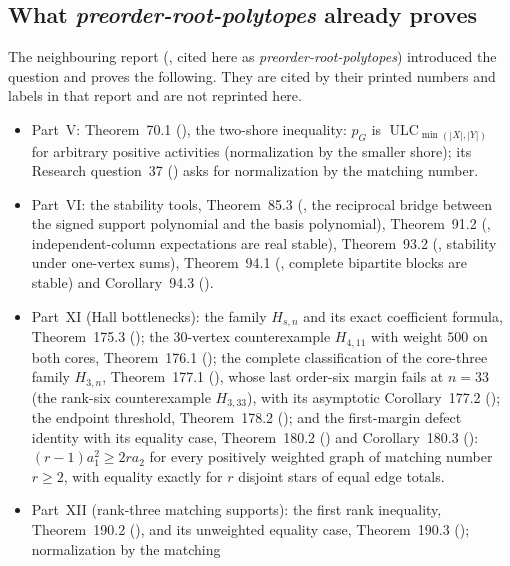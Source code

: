 \documentclass[11pt,a4paper]{article}
\theoremstyle{remark}\newtheorem{remark}[theorem]{Remark}
\newcommand{\ULC}{\operatorname{ULC}}      %
\newcommand{\prp}{\emph{preorder-root-polytopes}}
\begin{document}
\subsection{What \texorpdfstring{\prp}{preorder-root-polytopes} already proves}\label{mrn:sec:prior}
The neighbouring report
(\cite{b:PRP}, cited here as \prp) introduced the question and proves
the following. They are cited by their printed numbers and labels in that
report and are not reprinted here.
\begin{itemize}
\item Part~V: Theorem~70.1 (), the two-shore
  inequality: $p_G$ is $\ULC_{\min(|X|,|Y|)}$ for arbitrary positive
  activities (normalization by the smaller shore); its Research
  question~37 () asks for normalization by the matching
  number.
\item Part~VI: the stability tools, Theorem~85.3 (,
  the reciprocal bridge between the signed support polynomial and the
  basis polynomial), Theorem~91.2 (, independent-column
  expectations are real stable), Theorem~93.2 (,
  stability under one-vertex sums), Theorem~94.1 (,
  complete bipartite blocks are stable) and Corollary~94.3
  ().
\item Part~XI (Hall bottlenecks): the family $H_{s,n}$ and its exact
  coefficient formula, Theorem~175.3 (); the
  30-vertex counterexample $H_{4,11}$ with weight $500$ on both cores,
  Theorem~176.1 (); the complete classification of
  the core-three family $H_{3,n}$, Theorem~177.1
  (), whose last order-six margin fails at
  $n=33$ (the rank-six counterexample $H_{3,33}$), with its asymptotic
  Corollary~177.2 (); the endpoint
  threshold, Theorem~178.2 (); and the first-margin
  defect identity with its equality case, Theorem~180.2
  () and Corollary~180.3
  (): $(r-1)a_1^2\ge2ra_2$ for every positively
  weighted graph of matching number $r\ge2$, with equality exactly for $r$
  disjoint stars of equal edge totals.
\item Part~XII (rank-three matching supports): the first rank inequality,
  Theorem~190.2 (), and its unweighted equality case,
  Theorem~190.3 (); normalization by the matching

\end{itemize}
\end{document}
